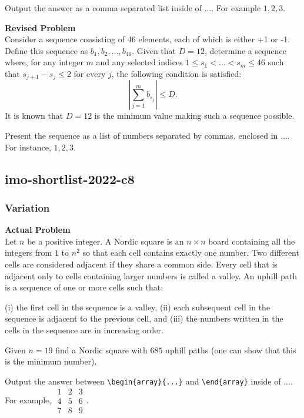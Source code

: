 Output the answer as a comma separated list inside of $\boxed{...}$. For example $\boxed{1, 2, 3}$.

\textbf{Revised Problem}\\
Consider a sequence consisting of 46 elements, each of which is either +1 or -1. Define this sequence as $b_1, b_2, \ldots, b_{46}$. Given that $D = 12$, determine a sequence where, for any integer $m$ and any selected indices $1 \le s_1 < \dots < s_m \le 46$ such that $s_{j+1} - s_j \le 2$ for every $j$, the following condition is satisfied:
$$\left| \sum_{j=1}^{m} b_{s_j} \right| \leq D.$$
It is known that $D = 12$ is the minimum value making such a sequence possible.

Present the sequence as a list of numbers separated by commas, enclosed in $\boxed{...}$. For instance, $\boxed{1, 2, 3}$.

\subsection{imo-shortlist-2022-c8}
\subsubsection{Variation}
\textbf{Actual Problem}\\
Let $n$ be a positive integer. A Nordic square is an $n \times n$ board containing all the integers from $1$ to $n^2$ so that each cell contains exactly one number. Two different cells are considered adjacent if they share a common side. Every cell that is adjacent only to cells containing larger numbers is called a valley. An uphill path is a sequence of one or more cells such that:

(i) the first cell in the sequence is a valley,
(ii) each subsequent cell in the sequence is adjacent to the previous cell, and
(iii) the numbers written in the cells in the sequence are in increasing order.

Given $n = 19$ find a Nordic square with $685$ uphill paths (one can show that this is the minimum number).


Output the answer between \verb|\begin{array}{...}| and \verb|\end{array}| inside of $\boxed{...}$. For example, $\boxed{\begin{array}{ccc}1 & 2 & 3 \\ 4 & 5 & 6 \\ 7 & 8 & 9\end{array}}$.

